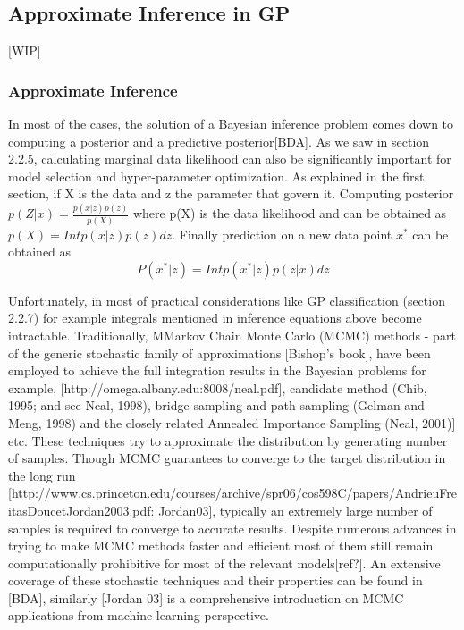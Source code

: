 \subsection{Approximate Inference in GP}[WIP]

\subsubsection{Approximate Inference}

In most of the cases, the solution of a Bayesian inference problem comes down to computing a posterior and a predictive posterior[BDA]. As we saw in section 2.2.5, calculating marginal data likelihood can also be significantly important for model selection and hyper-parameter optimization. 
As explained in the first section, if X is the data and z the parameter that govern it.
Computing posterior $p(Z|x)  = \frac{p(x|z)p(z)}{p(X)}$ where p(X) is the data likelihood and can be obtained as $p(X) = Int p(x|z)p(z)dz$. Finally prediction on a new data point $x^*$ can be obtained as
 	$$P(x^*|z) = Int p(x^*|z)p(z|x)dz$$		

Unfortunately, in most of practical considerations like GP classification (section 2.2.7) for example integrals mentioned in inference equations above become intractable. Traditionally, MMarkov Chain Monte Carlo (MCMC) methods - part of the generic stochastic family of approximations [Bishop’s book], have been employed to achieve the full integration results in the Bayesian problems for example, [http://omega.albany.edu:8008/neal.pdf], candidate method (Chib, 1995; and see Neal, 1998), bridge sampling and path sampling (Gelman and Meng, 1998) and the closely related Annealed Importance Sampling (Neal, 2001)] etc.
These techniques try to approximate the distribution by generating number of samples. Though MCMC guarantees to converge to the target distribution in the long run [http://www.cs.princeton.edu/courses/archive/spr06/cos598C/papers/AndrieuFreitasDoucetJordan2003.pdf: Jordan03], typically an extremely large number of samples is required to converge to accurate results.  Despite numerous advances in trying to make MCMC methods faster and efficient most of them still remain computationally prohibitive for most of the relevant models[ref?]. An extensive coverage of these stochastic techniques and their properties can be found in [BDA], similarly [Jordan 03] is a comprehensive introduction on MCMC applications from machine learning perspective. 

